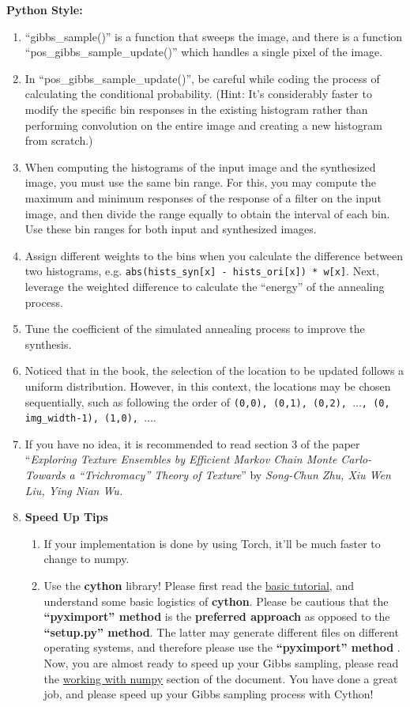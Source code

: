 \documentclass[11pt]{article}
\begin{document}
\begin{enumerate}
    \textbf{Python Style: }
    \begin{enumerate}
        \item ``gibbs\_sample()'' is a function that sweeps the image, and there is a function ``pos\_gibbs\_sample\_update()'' which handles a single pixel of the image.
        \item In ``pos\_gibbs\_sample\_update()'', be careful while coding the process of calculating the conditional probability. (Hint: It's considerably faster to modify the specific bin responses in the existing histogram rather than performing convolution on the entire image and creating a new histogram from scratch.)
        \item When computing the histograms of the input image and the synthesized image, you must use the same bin range. For this, you may compute the maximum and minimum responses of the response of a filter on the input image, and then divide the range equally to obtain the interval of each bin. Use these bin ranges for both input and synthesized images.
        \item Assign different weights to the bins when you calculate the difference between two histograms, e.g. \texttt{abs(hists\_syn{[}x{]} - hists\_ori{[}x{]}) * w{[}x{]}}. Next, leverage the weighted difference to calculate the ``energy'' of the annealing process.
        \item Tune the coefficient of the simulated annealing process to improve the synthesis.
        \item Noticed that in the book, the selection of the location to be updated follows a uniform distribution. However, in this context, the locations may be chosen sequentially, such as following the order of \texttt{(0,0), (0,1), (0,2), $\ldots$, (0, img\_width-1), (1,0), $\ldots$}.
        \item If you have no idea, it is recommended to read section 3 of the paper ``\textit{Exploring Texture Ensembles by Efficient Markov Chain Monte Carlo- Towards a ``Trichromacy'' Theory of Texture}'' by \textit{Song-Chun Zhu, Xiu Wen Liu, Ying Nian Wu.} 
        \item \textbf{Speed Up Tips} 
        \begin{enumerate}
            \item If your implementation is done by using Torch, it'll be much faster to change to numpy.
            \item Use the \textbf{cython} library! Please first read the \href{https://cython.readthedocs.io/en/latest/src/tutorial/cython_tutorial.html}{basic tutorial}, and understand some basic logistics of \textbf{cython}. Please be cautious that the \textbf{``pyximport'' method} is the \textbf{preferred approach} as opposed to the \textbf{``setup.py'' method}. The latter may generate different files on different operating systems, and therefore please use the \textbf{``pyximport'' method} . Now, you are almost ready to speed up your Gibbs sampling, please read the \href{https://cython.readthedocs.io/en/latest/src/tutorial/numpy.html}{working with numpy} section of the document. You have done a great job, and please speed up your Gibbs sampling process with Cython!

\end{enumerate}
\end{enumerate}
\end{enumerate}
\end{document}
